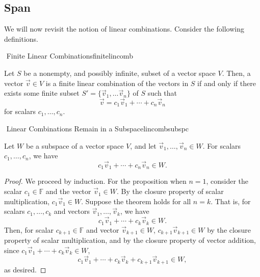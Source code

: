     \subsection{Span}
        
        We will now revisit the notion of linear combinations. Consider the following definitions.
        \begin{definition}{\Stop\,\,Finite Linear Combinations}{finitelincomb}

            Let \(S\) be a nonempty, and possibly infinite, subset of a vector space \(V\). Then, a vector \(\vec{v}\in V\) is a finite linear combination of the vectors in \(S\) if and only if there exists some finite subset \(S'=\{\vec{v}_1,\ldots\vec{v}_n\}\) of \(S\) such that
            \begin{equation*}
                \vec{v}=c_1\vec{v}_1+\cdots+c_n\vec{v}_n
            \end{equation*}
            for scalars \(c_1,\ldots,c_n\).
            
        \end{definition}
        \begin{theorem}{\Stop\,\,Linear Combinations Remain in a Subspace}{lincombsubspc}

            Let \(W\) be a subspace of a vector space \(V\), and let \(\vec{v}_1,\ldots,\vec{v}_n\in W\). For scalars \(c_1,\ldots,c_n\), we have
            \begin{equation*}
                c_1\vec{v}_1+\cdots+c_n\vec{v}_n\in W.
            \end{equation*}
            \begin{proof}
                We proceed by induction. For the proposition when \(n=1\), consider the scalar \(c_1\in\mathbb{F}\) and the vector \(\vec{v}_1\in W\). By the closure property of scalar multiplication, \(c_1\vec{v}_1\in W\). Suppose the theorem holds for all \(n=k\). That is, for scalars \(c_1,\ldots,c_k\) and vectors \(\vec{v}_1,\ldots,\vec{v}_k\), we have
                \begin{equation*}
                    c_1\vec{v}_1+\cdots+c_k\vec{v}_k\in W.
                \end{equation*}
                Then, for scalar \(c_{k+1}\in\mathbb{F}\) and vector \(\vec{v}_{k+1}\in W\), \(c_{k+1}\vec{v}_{k+1}\in W\) by the closure property of scalar multiplication, and by the closure property of vector addition,
                since \( c_1\vec{v}_1+\cdots+c_k\vec{v}_k\in W\), 
                \begin{equation*}
                    c_1\vec{v}_1+\cdots+c_k\vec{v}_k+c_{k+1}\vec{v}_{k+1}\in W,
                \end{equation*}
                as desired.
            \end{proof}
        \end{theorem}
